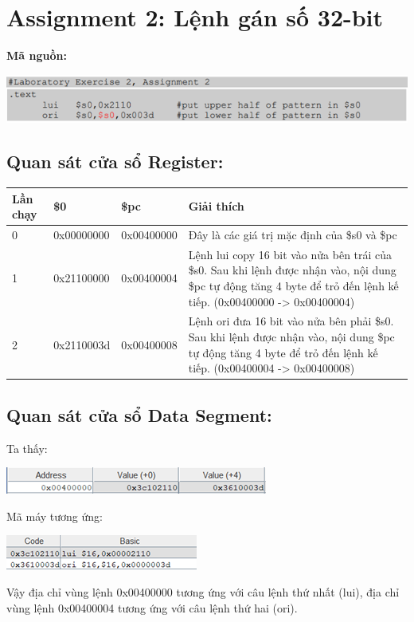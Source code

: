 \documentclass[12pt,a4paper,oneside]{article}
\begin{document}
\section{Assignment 2: Lệnh gán số 32-bit}
	\textbf{Mã nguồn:}
	\begin{center}
	\includegraphics[scale=1]{image/5}
	\end{center}
	\subsection{Quan sát cửa sổ Register:}
		\begin{center}
		\begin{tabular}{|l|l|l|>{\raggedright\arraybackslash}p{8cm}|}
		\hline 
		Lần chạy & \$0 & \$pc & Giải thích \\ 
		\hline 
		0 & 0x00000000 & 0x00400000 & Đây là các giá trị mặc định của \$s0 và \$pc \\ 
		\hline 
		1 & 0x21100000 & 0x00400004 & Lệnh lui copy 16 bit vào nửa bên trái của \$s0. Sau khi lệnh được nhận vào, nội dung \$pc tự động tăng 4 byte để trỏ đến lệnh kế tiếp. (0x00400000 -> 0x00400004) \\ 
		\hline 
		2 & 0x2110003d & 0x00400008 & Lệnh ori đưa 16 bit vào nửa bên phải \$s0. Sau khi lệnh được nhận vào, nội dung \$pc tự động tăng 4 byte để trỏ đến lệnh kế tiếp. (0x00400004 -> 0x00400008) \\ 
		\hline 
		\end{tabular} 
		\end{center}
	\subsection{Quan sát cửa sổ Data Segment:}
	Ta thấy:
	\begin{center}
	\includegraphics[scale=1.5]{image/6}
	\end{center}
	Mã máy tương ứng: 
	\begin{center}
	\includegraphics[scale=1.5]{image/7}
	\end{center}
	Vậy địa chỉ vùng lệnh 0x00400000 tương ứng với câu lệnh thứ nhất (lui), địa chỉ vùng lệnh 0x00400004 tương ứng với câu lệnh thứ hai (ori).
\pagebreak
\end{document}
